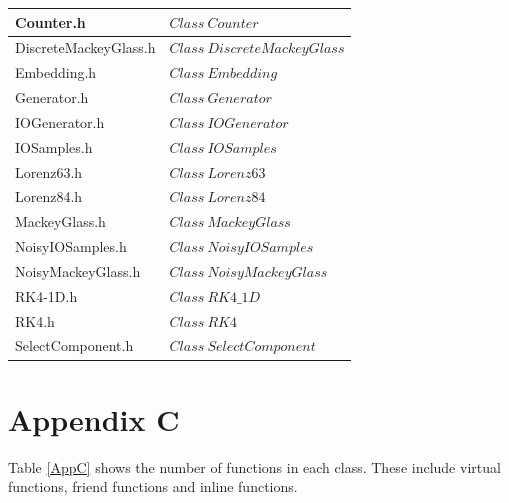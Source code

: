 \documentclass[twocolumn]{article}
\begin{document}
\begin{table}[h]
\begin{center}
{\begin{tabular}{|l|l|}
Counter.h                    & $Class \ Counter                    $ \\\hline
DiscreteMackeyGlass.h        & $Class \ DiscreteMackeyGlass        $ \\\hline
Embedding.h                  & $Class \ Embedding                  $ \\\hline
Generator.h                  & $Class \ Generator                  $ \\\hline
IOGenerator.h                & $Class \ IOGenerator                $ \\\hline
IOSamples.h                  & $Class \ IOSamples                  $ \\\hline
Lorenz63.h                   & $Class \ Lorenz63                   $ \\\hline
Lorenz84.h                   & $Class \ Lorenz84                   $ \\\hline
MackeyGlass.h                & $Class \ MackeyGlass                $ \\\hline
NoisyIOSamples.h             & $Class \ NoisyIOSamples             $ \\\hline
NoisyMackeyGlass.h           & $Class \ NoisyMackeyGlass           $ \\\hline
RK4-1D.h                     & $Class \ RK4\_1D                    $ \\\hline
RK4.h                        & $Class \ RK4                        $ \\\hline
SelectComponent.h            & $Class \ SelectComponent            $ \\\hline
\end{tabular}
}
\end{center}
\end{table}

\clearpage

\section*{Appendix C}

\noindent
Table \ref{AppC} shows the number of functions in each class. These
include virtual functions, friend functions and inline functions.

\newpage

\vspace*{20mm}
\end{document}

